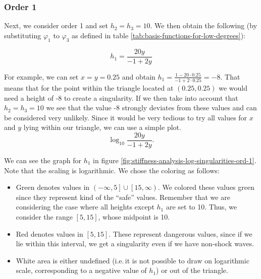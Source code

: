 \documentclass{article}
\newcommand{\todo}[2][]{\textcolor{red}{TODO\ifthenelse{\equal{#1}{}}{}{[#1]}: #2}}
\newcommand{\done}[2][]{\textcolor{green!50!black}{DONE\ifthenelse{\equal{#1}{}}{}{[#1]}: #2}}
\newcommand{\remark}[2][]{\textcolor{red!70!yellow}{REMARK\ifthenelse{\equal{#1}{}}{}{[#1]}: #2}}
\renewcommand{\phi}{\varphi}
\begin{document}
\subsubsection{Order 1}
\label{sec:stiffness-analysis-singluarities-ord-1}

Next, we consider order 1 and set $h_2=h_3=10$. We then obtain the following (by substituting $\phi_1$ to $\phi_3$ as defined in table \ref{tab:basis-functions-for-low-degrees}):

\begin{equation*}
  h_1 = \frac{20y}{-1+2y}
\end{equation*}

For example, we can set $x=y=0.25$ and obtain $  h_1 = \frac{1-20\cdot 0.25}{-1+2\cdot 0.25} = -8$. That means that for the point within the triangle located at $(0.25, 0.25)$ we would need a height of -8 to create a singularity. If we then take into account that $h_2=h_3=10$ we see that the value -8 strongly deviates from these values and can be considered very unlikely. Since it would be very tedious to try all values for $x$ and $y$ lying within our triangle, we can use a simple plot.
\begin{equation*}
\log_{10}\frac{20y}{-1+2y}.
\end{equation*}

We can see the graph for $h_1$ in figure \ref{fig:stiffness-analysis-log-singularities-ord-1}. Note that the scaling is logarithmic. We chose the coloring as follows:

\begin{itemize}
\item Green denotes values in $\left( -\infty, 5 \right] \cup \left[ 15, \infty \right)$. We colored these values green since they represent kind of the ``safe'' values. Remember that we are considering the case where all heights except $h_1$ are set to 10. Thus, we consider the range $\left[ 5, 15 \right]$, whose midpoint is 10.

\item Red denotes values in $\left[ 5, 15 \right]$. These represent dangerous values, since if we lie within this interval, we get a singularity even if we have non-shock waves.
\item White area is either undefined (i.e.\,it is not possible to draw on logarithmic scale, corresponding to a negative value of $h_1$) or out of the triangle.
\end{itemize}
\end{document}

